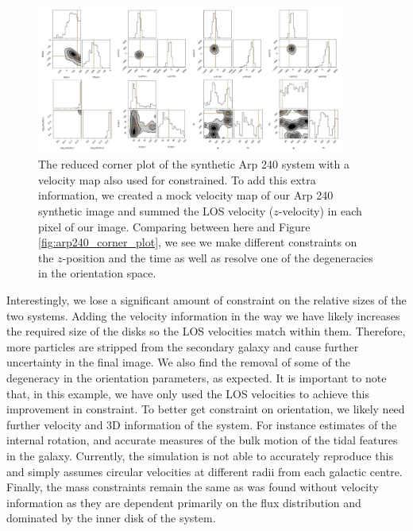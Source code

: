 \begin{figure}
\centering
\includegraphics[width=0.9\textwidth]{Chapter1/figures/Arp240_vel-red-corner.pdf}
\caption[The reduced corner plot of the synthetic Arp 240 system with a velocity map also used for constrained.]{The reduced corner plot of the synthetic Arp 240 system with a velocity map also used for constrained. To add this extra information, we created a mock velocity map of our Arp 240 synthetic image and summed the LOS velocity ($z$-velocity) in each pixel of our image. Comparing between here and Figure \ref{fig:arp240_corner_plot}, we see we make different constraints on the $z$-position and the time as well as resolve one of the degeneracies in the orientation space.}
\label{fig:velocity_corner_plot}
\end{figure}

Interestingly, we lose a significant amount of constraint on the relative sizes of the two systems. Adding the velocity information in the way we have likely increases the required size of the disks so the LOS velocities match within them. Therefore, more particles are stripped from the secondary galaxy and cause further uncertainty in the final image. We also find the removal of some of the degeneracy in the orientation parameters, as expected. It is important to note that, in this example, we have only used the LOS velocities to achieve this improvement in constraint. To better get constraint on orientation, we likely need further velocity and 3D information of the system. For instance estimates of the internal rotation, and accurate measures of the bulk motion of the tidal features in the galaxy. Currently, the simulation is not able to accurately reproduce this and simply assumes circular velocities at different radii from each galactic centre. Finally, the mass constraints remain the same as was found without velocity information as they are dependent primarily on the flux distribution and dominated by the inner disk of the system.


